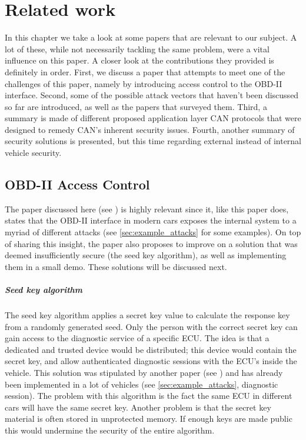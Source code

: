\chapter{Related work}
\label{chap:related_work}

In this chapter we take a look at some papers that are relevant to our subject. A lot of these, while not necessarily tackling the same problem, were a vital influence on this paper. A closer look at the contributions they provided is definitely in order. First, we discuss a paper that attempts to meet one of the challenges of this paper, namely by introducing access control to the OBD-II interface. Second, some of the possible attack vectors that haven't been discussed so far are introduced, as well as the papers that surveyed them. Third, a summary is made of different proposed application layer CAN protocols that were designed to remedy CAN's inherent security issues. Fourth, another summary of security solutions is presented, but this time regarding external instead of internal vehicle security. 

\section{OBD-II Access Control}
\label{sec:obd_access_control}

The paper discussed here (see \cite{Yadav16}) is highly relevant since it, like this paper does, states that the OBD-II interface in modern cars exposes the internal system to a myriad of different attacks (see \ref{sec:example_attacks} for some examples). On top of sharing this insight, the paper also proposes to improve on a solution that was deemed insufficiently secure (the seed key algorithm), as well as implementing them in a small demo. These solutions will be discussed next.


\paragraph{Seed key algorithm} The seed key algorithm applies a secret key value to calculate the response key from a randomly generated seed. Only the person with the correct secret key can gain access to the diagnostic service of a specific ECU. The idea is that a dedicated and trusted device would be distributed; this device would contain the secret key, and allow authenticated diagnostic sessions with the ECU's inside the vehicle. This solution was stipulated by another paper (see \cite{Bayer}) and has already been implemented in a lot of vehicles (see \ref{sec:example_attacks}, diagnostic session). The problem with this algorithm is the fact the same ECU in different cars will have the same secret key. Another problem is that the secret key material is often stored in unprotected memory. If enough keys are made public this would undermine the security of the entire algorithm.  

